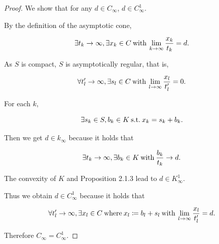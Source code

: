 \documentclass[a4paper,11pt]{jsarticle}
\newcommand{\SuchThat}{\:\text{s.t.}\:}
\begin{document}
\begin{proof}
  We show that for any $d \in C_{\infty}$, $d \in C_{\infty}^1$.

  By the definition of the asymptotic cone,

  \begin{equation}
    \exists t_k \rightarrow \infty, \exists x_k \in C \:\text{with}\: \lim_{k \to \infty} \frac{x_k}{t_k} = d. \notag
  \end{equation}

  As $S$ is compact, $S$ is asymptotically regular, that is,

  \begin{equation}
    \forall t'_l \rightarrow \infty, \exists s_l \in C \:\text{with}\: \lim_{l \to \infty} \frac{x_l}{t'_l} = 0. \notag
  \end{equation}

  For each $k$,

  \begin{equation}
    \exists s_k \in S, b_k \in K \SuchThat x_k = s_k + b_k. \notag
  \end{equation}

  Then we get $d \in k_{\infty}$ because it holds that

  \begin{equation}
    \exists t_k \rightarrow \infty, \exists b_k \in K \:\text{with}\: \frac{b_k}{t_k} \rightarrow d. \notag
  \end{equation}

  The convexity of $K$ and Proposition 2.1.3 lead to $d \in K_{\infty}^1$.

  Thus we obtain $d \in C_{\infty}^1$ because it holds that

  \begin{equation}
    \forall t'_l \rightarrow \infty, \exists x_l \in C \:\text{where}\: x_l \coloneqq b_l + s_l \:\text{with}\: \lim_{l \to \infty} \frac{x_l}{t'_l} = d. \notag
  \end{equation}

  Therefore $C_{\infty} = C_{\infty}^1$.

\end{proof}
\end{document}
